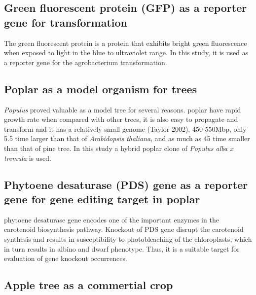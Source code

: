 \documentclass[
]{article}
\begin{document}
\hypertarget{green-fluorescent-protein-gfp-as-a-reporter-gene-for-transformation}{%
\subsection{Green fluorescent protein (GFP) as a reporter gene for
transformation}\label{green-fluorescent-protein-gfp-as-a-reporter-gene-for-transformation}}

The green fluorescent protein is a protein that exhibits bright green
fluorescence when exposed to light in the blue to ultraviolet range. In
this study, it is used as a reporter gene for the agrobacterium
transformation.

\hypertarget{poplar-as-a-model-organism-for-trees}{%
\subsection{Poplar as a model organism for
trees}\label{poplar-as-a-model-organism-for-trees}}

\emph{Populus} proved valuable as a model tree for several reasons.
poplar have rapid growth rate when compared with other trees, it is also
easy to propagate and transform and it has a relatively small genome
(Taylor 2002), 450-550Mbp, only 5.5 time larger than that of
\emph{Arabidopsis thaliana}, and as much as 45 time smaller than that of
pine tree. In this study a hybrid poplar clone of \emph{Populus alba x
tremula} is used.

\hypertarget{phytoene-desaturase-pds-gene-as-a-reporter-gene-for-gene-editing-target-in-poplar}{%
\subsection{Phytoene desaturase (PDS) gene as a reporter gene for gene
editing target in
poplar}\label{phytoene-desaturase-pds-gene-as-a-reporter-gene-for-gene-editing-target-in-poplar}}

phytoene desaturase gene encodes one of the important enzymes in the
carotenoid biosynthesis pathway. Knockout of PDS gene disrupt the
carotenoid synthesis and results in susceptibility to photobleaching of
the chloroplasts, which in turn results in albino and dwarf phenotype.
Thus, it is a suitable target for evaluation of gene knockout
occurrences.

\hypertarget{apple-tree-as-a-commertial-crop}{%
\subsection{Apple tree as a commertial
crop}\label{apple-tree-as-a-commertial-crop}}
\end{document}
